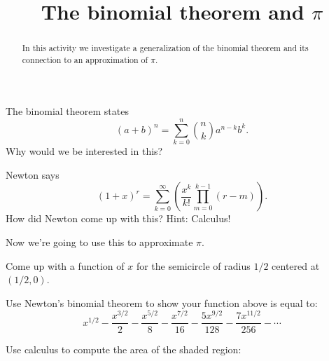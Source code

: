 \documentclass[nooutcomes]{ximera}
\title{The binomial theorem and $\pi$}
\begin{document}
\begin{abstract}
In this activity we investigate a generalization of the binomial theorem and its connection to an approximation of $\pi$.
\end{abstract}
\maketitle


\begin{question}
The binomial theorem states
\[
(a+b)^n = \sum_{k=0}^n \binom{n}{k} a^{n-k}b^k.
\]
Why would we be interested in this? 
\end{question}

\begin{question}
Newton says
\[
(1+x)^r = \sum_{k=0}^\infty \left(\frac{x^k}{k!} \prod_{m = 0}^{k-1}(r-m)\right).
\]
How did Newton come up with this? Hint: Calculus!
\end{question}

Now we're going to use this to approximate $\pi$.

\begin{question}
Come up with a function of $x$ for the semicircle of radius $1/2$ centered at $(1/2,0)$. 
\end{question}

\begin{question}
Use Newton's binomial theorem to show your function above is equal to: 
\[
x^{1/2} - \frac{x^{3/2}}{2} - \frac{x^{5/2}}{8} - \frac{x^{7/2}}{16}   - \frac{5x^{9/2}}{128}  - \frac{7x^{11/2}}{256} - \cdots
\]
\end{question}

\begin{question}
Use calculus to compute the area of the shaded region:
\begin{image}
\end{image}
\end{question}
\end{document}
